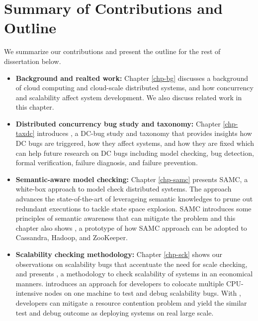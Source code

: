 \section{Summary of Contributions and Outline}

We summarize our contributions and present the outline for the rest of
dissertation below.

\begin{itemize}

\item \textbf{Background and realted work:} Chapter \ref{chp-bg} discusses a
background of cloud computing and cloud-scale distributed systems, and how
concurrency and scalability affect system development. We also discuss related
work in this chapter.

\item \textbf{Distributed concurrency bug study and taxonomy:} Chapter
\ref{chp-taxdc} introduces \taxdc, a DC-bug study and taxonomy that provides
insights how DC bugs are triggered, how they affect systems, and how they are
fixed which can help future research on DC bugs including model checking, bug
detection, formal verification, failure diagnosis, and failure prevention.

\item \textbf{Semantic-aware model checking:} Chapter \ref{chp-samc} presents
SAMC, a white-box approach to model check distributed systems. The approach
advances the state-of-the-art of leverageing semantic knowledges to prune out
redundant executions to tackle state space explosion. SAMC introduces some
principles of semantic awareness that can mitigate the problem and this chapter
also shows \sampro, a prototype of how SAMC approach can be adopted to
Cassandra, Hadoop, and ZooKeeper.


\item \textbf{Scalability checking methodology:} Chapter \ref{chp-sck} shows our
observations on scalability bugs that accentuate the need for scale checking,
and presents \sck, a methodology to check scalability of systems in an
economical manners. \sck introduces an approach for developers to colocate
multiple CPU-intensive nodes on one machine to test and debug scalability bugs.
With \sck, developers can mitigate a resource contention problem and yield the
similar test and debug outcome as deploying systems on real large scale.


\end{itemize}
